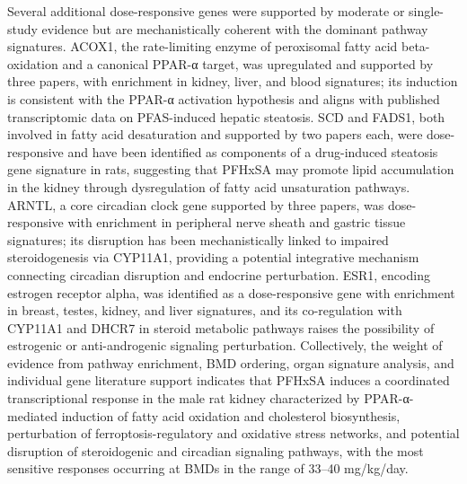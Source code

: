 Several additional dose-responsive genes were supported by moderate or single-study evidence but are mechanistically coherent with the dominant pathway signatures. ACOX1, the rate-limiting enzyme of peroxisomal fatty acid beta-oxidation and a canonical PPAR-α target, was upregulated and supported by three papers, with enrichment in kidney, liver, and blood signatures; its induction is consistent with the PPAR-α activation hypothesis and aligns with published transcriptomic data on PFAS-induced hepatic steatosis. SCD and FADS1, both involved in fatty acid desaturation and supported by two papers each, were dose-responsive and have been identified as components of a drug-induced steatosis gene signature in rats, suggesting that PFHxSA may promote lipid accumulation in the kidney through dysregulation of fatty acid unsaturation pathways. ARNTL, a core circadian clock gene supported by three papers, was dose-responsive with enrichment in peripheral nerve sheath and gastric tissue signatures; its disruption has been mechanistically linked to impaired steroidogenesis via CYP11A1, providing a potential integrative mechanism connecting circadian disruption and endocrine perturbation. ESR1, encoding estrogen receptor alpha, was identified as a dose-responsive gene with enrichment in breast, testes, kidney, and liver signatures, and its co-regulation with CYP11A1 and DHCR7 in steroid metabolic pathways raises the possibility of estrogenic or anti-androgenic signaling perturbation. Collectively, the weight of evidence from pathway enrichment, BMD ordering, organ signature analysis, and individual gene literature support indicates that PFHxSA induces a coordinated transcriptional response in the male rat kidney characterized by PPAR-α-mediated induction of fatty acid oxidation and cholesterol biosynthesis, perturbation of ferroptosis-regulatory and oxidative stress networks, and potential disruption of steroidogenic and circadian signaling pathways, with the most sensitive responses occurring at BMDs in the range of 33–40 mg/kg/day.

